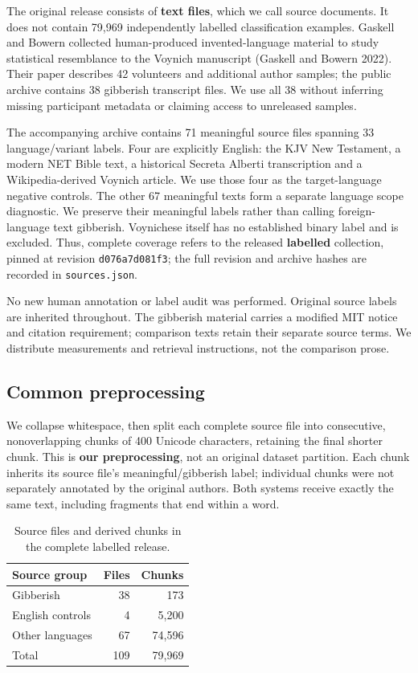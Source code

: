 \documentclass[10pt,a4paper,twocolumn]{article}
\begin{document}
The original release consists of \textbf{text files}, which we call
source documents. It does not contain 79,969 independently labelled
classification examples. Gaskell and Bowern collected human-produced
invented-language material to study statistical resemblance to the
Voynich manuscript (Gaskell and Bowern 2022). Their paper describes 42
volunteers and additional author samples; the public archive contains 38
gibberish transcript files. We use all 38 without inferring missing
participant metadata or claiming access to unreleased samples.

The accompanying archive contains 71 meaningful source files spanning 33
language/variant labels. Four are explicitly English: the KJV New
Testament, a modern NET Bible text, a historical Secreta Alberti
transcription and a Wikipedia-derived Voynich article. We use those four
as the target-language negative controls. The other 67 meaningful texts
form a separate language scope diagnostic. We preserve their meaningful
labels rather than calling foreign-language text gibberish. Voynichese
itself has no established binary label and is excluded. Thus, complete
coverage refers to the released \textbf{labelled} collection, pinned at
revision \texttt{d076a7d081f3}; the full revision and archive hashes are
recorded in \texttt{sources.json}.

No new human annotation or label audit was performed. Original source
labels are inherited throughout. The gibberish material carries a
modified MIT notice and citation requirement; comparison texts retain
their separate source terms. We distribute measurements and retrieval
instructions, not the comparison prose.

\subsection{Common preprocessing}\label{common-preprocessing}

We collapse whitespace, then split each complete source file into
consecutive, nonoverlapping chunks of 400 Unicode characters, retaining
the final shorter chunk. This is \textbf{our preprocessing}, not an
original dataset partition. Each chunk inherits its source file's
meaningful/gibberish label; individual chunks were not separately
annotated by the original authors. Both systems receive exactly the same
text, including fragments that end within a word.

\begin{table}[htbp]
\centering
\small
\caption{Source files and derived chunks in the complete labelled release.}
\begin{tabular}{@{}lrr@{}}
\toprule
Source group & Files & Chunks \\
\midrule
Gibberish & 38 & 173 \\
English controls & 4 & 5,200 \\
Other languages & 67 & 74,596 \\
Total & 109 & 79,969 \\
\bottomrule
\end{tabular}
\end{table}
\end{document}
